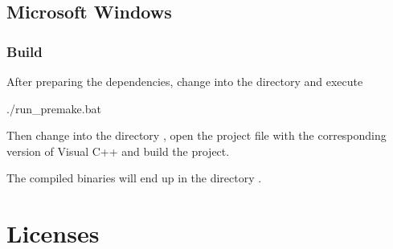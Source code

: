 \section{Microsoft Windows}

\subsection{Build}

After preparing the dependencies, change into the directory
 and execute

\begin{VerbatimBoth}
  ./run_premake.bat
\end{VerbatimBoth}

Then change into the directory , open the
project file with the corresponding version of Visual C++ and build
the project.

The compiled binaries will end up in the directory .

\chapter{Licenses}

\scriptsize

\normalsize

\scriptsize

\normalsize




